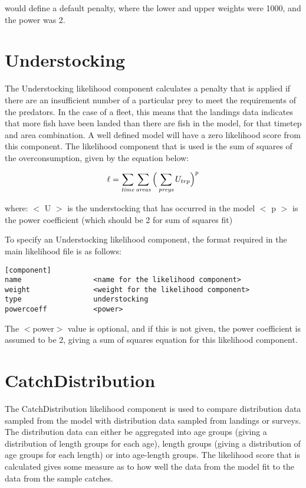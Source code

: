 \documentclass[]{book}
\begin{document}
would define a default penalty, where the lower and upper weights were
1000, and the power was 2.

\hypertarget{sec:understocking}{%
\section{Understocking}\label{sec:understocking}}

The Understocking likelihood component calculates a penalty that is
applied if there are an insufficient number of a particular prey to meet
the requirements of the predators. In the case of a fleet, this means
that the landings data indicates that more fish have been landed than
there are fish in the model, for that timetep and area combination. A
well defined model will have a zero likelihood score from this
component. The likelihood component that is used is the sum of squares
of the overconsumption, given by the equation below:

\begin{equation}
\label{eq:understocking}
\ell = \sum_{\it time}\sum_{\it areas} \Big(\sum_{\it preys} U_{trp} \Big)^p\end{equation}

where: \(<\) U \(>\) is the understocking that has occurred in the model \(<\)
p \(>\) is the power coefficient (which should be 2 for sum of squares
fit)

To specify an Understocking likelihood component, the format required in
the main likelihood file is as follows:

\begin{verbatim}
[component]
name                 <name for the likelihood component>
weight               <weight for the likelihood component>
type                 understocking
powercoeff           <power>
\end{verbatim}

The \(<\)power\(>\) value is optional, and if this is not given, the power
coefficient is assumed to be 2, giving a sum of squares equation for
this likelihood component.

\hypertarget{sec:catchdist}{%
\section{CatchDistribution}\label{sec:catchdist}}

The CatchDistribution likelihood component is used to compare
distribution data sampled from the model with distribution data sampled
from landings or surveys. The distribution data can either be aggregated
into age groups (giving a distribution of length groups for each age),
length groups (giving a distribution of age groups for each length) or
into age-length groups. The likelihood score that is calculated gives
some measure as to how well the data from the model fit to the data from
the sample catches.
\end{document}
